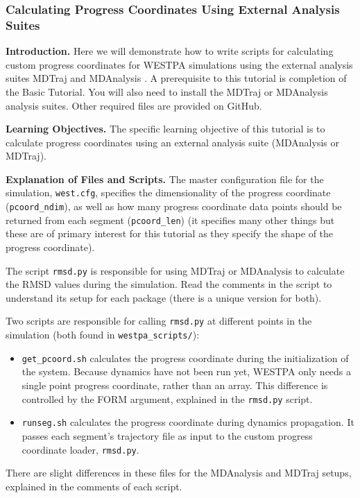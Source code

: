 \documentclass[9pt,tutorial,pubversion]{livecoms}
\begin{document}
\subsubsection{Calculating Progress Coordinates Using External Analysis Suites}

\textbf{Introduction.} Here we will demonstrate how to write scripts for calculating custom progress coordinates for WESTPA simulations using the external analysis suites MDTraj and MDAnalysis \citep{mda2011,mda2016,mdt2015}. 
A prerequisite to this tutorial is completion of the Basic Tutorial. 
You will also need to install the MDTraj or MDAnalysis analysis suites. 
Other required files are provided on GitHub.

\textbf{Learning Objectives.} The specific learning objective of this tutorial is to calculate progress coordinates using an external analysis suite (MDAnalysis or MDTraj). 

\textbf{Explanation of Files and Scripts.} The master configuration file for the simulation, \verb|west.cfg|, specifies the dimensionality of the progress coordinate (\verb|pcoord_ndim|), as well as how many progress coordinate data points should be returned from each segment (\verb|pcoord_len|) (it specifies many other things but these are of primary interest for this tutorial as they specify the shape of the progress coordinate).

The script \verb|rmsd.py| is responsible for using MDTraj or MDAnalysis to calculate the RMSD values during the simulation. 
Read the comments in the script to understand its setup for each package (there is a unique version for both).

Two scripts are responsible for calling \verb|rmsd.py| at different points in the simulation (both found in \verb|westpa_scripts/|):
\begin{itemize}
\item \verb|get_pcoord.sh| calculates the progress coordinate during the initialization of the system. 
Because dynamics have not been run yet, WESTPA only needs a single point progress coordinate, rather than an array. 
This difference is controlled by the FORM argument, explained in the \verb|rmsd.py| script.
\item \verb|runseg.sh| calculates the progress coordinate during dynamics propagation. 
It passes each segment's trajectory file as input to the custom progress coordinate loader, \verb|rmsd.py|.
\end{itemize}

There are slight differences in these files for the MDAnalysis and MDTraj setups, explained in the comments of each script.
\end{document}
